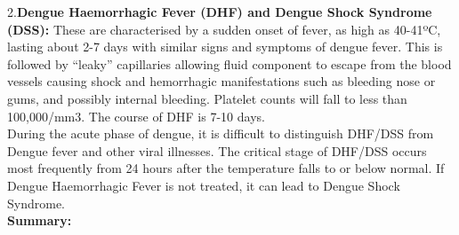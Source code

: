 \documentclass[11pt]{exam}
\begin{document}
\begin{questions}
2.\textbf{Dengue Haemorrhagic Fever (DHF) and Dengue Shock Syndrome (DSS):} These are
characterised by a sudden onset of fever, as high as 40-41ºC, lasting about
2-7 days with similar signs and symptoms of dengue fever. This is followed by
“leaky” capillaries allowing fluid component to escape from the blood vessels
causing shock and hemorrhagic manifestations such as bleeding nose or gums,
and possibly internal bleeding. Platelet counts will fall to less than 100,000/mm3.
The course of DHF is 7-10 days.\\
During the acute phase of dengue, it is difficult to distinguish DHF/DSS from
Dengue fever and other viral illnesses. The critical stage of DHF/DSS occurs most
frequently from 24 hours after the temperature falls to or below normal. If Dengue
Haemorrhagic Fever is not treated, it can lead to Dengue Shock Syndrome.
\\

\textbf{Summary:} \\
\\ \\


\end{questions}
\end{document}
